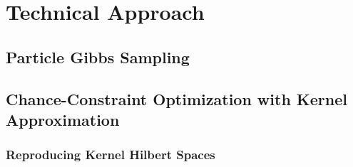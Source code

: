 \chapter{Technical Approach}

\section{Particle Gibbs Sampling}

\section{Chance-Constraint Optimization with Kernel Approximation}

\subsection{Reproducing Kernel Hilbert Spaces}


